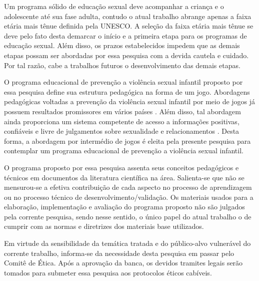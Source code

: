 Um programa sólido de educação sexual deve acompanhar a criança e o adolescente até sua fase adulta, contudo o atual trabalho abrange apenas a faixa etária mais tênue definida pela \ac{UNESCO}. A seleção da faixa etária mais tênue se deve pelo fato desta demarcar o início e a primeira etapa para os programas de educação sexual. Além disso, os prazos estabelecidos impedem que as demais etapas possam ser abordadas por essa pesquisa com a devida cautela e cuidado. Por tal razão, cabe a trabalhos futuros o desenvolvimento das demais etapas.

O programa educacional de prevenção a violência sexual infantil proposto por essa pesquisa define sua estrutura pedagógica na forma de um jogo. Abordagens pedagógicas voltadas a prevenção da violência sexual infantil por meio de jogos já possuem resultados promissores em vários países \cite{muller2014child, fingerle2018abschlussbericht}. Além disso, tal abordagem ainda proporciona um sistema competente de acesso a informações positivas, confiáveis e livre de julgamentos sobre sexualidade e relacionamentos \cite{unesco2018international}. Desta forma, a abordagem por intermédio de jogos é eleita pela presente pesquisa para contemplar um programa educacional de prevenção a violência sexual infantil. 

O programa proposto por essa pesquisa assenta seus conceitos pedagógicos e técnicos em documentos da literatura científica na área. Salienta-se que não se mensurou-se a efetiva contribuição de cada aspecto no processo de aprendizagem ou no processo técnico de desenvolvimento/validação. Os materiais usados para a elaboração, implementação e avaliação do programa proposto não são julgados pela corrente pesquisa, sendo nesse sentido, o único papel do atual trabalho o de cumprir com as normas e diretrizes dos materiais base utilizados. 

Em virtude da sensibilidade da temática tratada e do público-alvo vulnerável do corrente trabalho, informa-se da necessidade desta pesquisa em passar pelo Comitê de Ética. Após a aprovação da banca, os devidos tramites legais serão tomados para submeter essa pesquisa aos protocolos éticos cabíveis. 


